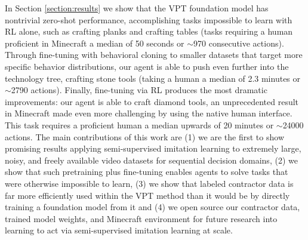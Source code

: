 In Section \ref{section:results} we show that the VPT foundation model has nontrivial zero-shot performance, accomplishing tasks impossible to learn with RL alone, such as crafting planks and crafting tables (tasks requiring a human proficient in Minecraft a median of 50 seconds or $\sim$970 consecutive actions).
Through fine-tuning with behavioral cloning to smaller datasets that target more specific behavior distributions, our agent is able to push even further into the technology tree, crafting stone tools (taking a human a median of 2.3 minutes or $\sim$2790 actions).
Finally, fine-tuning via RL produces the most dramatic improvements: our agent is able to craft diamond tools, an unprecedented result in Minecraft made even more challenging by using the native human interface. This task requires a proficient human a median upwards of 20 minutes or $\sim$24000 actions.
The main contributions of this work are (1) we are the first to show promising results applying semi-supervised imitation learning to extremely large, noisy, and freely available video datasets for sequential decision domains, (2) we show that such pretraining plus fine-tuning enables agents to solve tasks that were otherwise impossible to learn, (3) we show that labeled contractor data is far more efficiently used within the VPT method than it would be by directly training a foundation model from it and (4) we open source our contractor data, trained model weights, and Minecraft environment for future research into learning to act via semi-supervised imitation learning at scale.